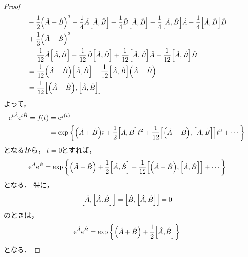 \documentclass{report}
\begin{document}
\begin{proof}
\begin{align}
        &- \frac{1}{2}\qty(\hat{A} + \hat{B})^3 - \frac{1}{4}\hat{A}\qty[\hat{A}, \hat{B}] - \frac{1}{4}\hat{B}\qty[\hat{A}, \hat{B}] - \frac{1}{4}\qty[\hat{A}, \hat{B}]\hat{A} - \frac{1}{4}\qty[\hat{A}, \hat{B}]\hat{B} \notag \\ 
        &+ \frac{1}{3}\qty(\hat{A} + \hat{B})^3 \\ 
        &= \frac{1}{12}\hat{A}\qty[\hat{A}, \hat{B}] - \frac{1}{12}\hat{B}\qty[\hat{A}, \hat{B}] + \frac{1}{12}\qty[\hat{A}, \hat{B}]\hat{A} - \frac{1}{12}\qty[\hat{A}, \hat{B}]\hat{B} \\ 
        &= \frac{1}{12}\qty(\hat{A} - \hat{B})\qty[\hat{A}, \hat{B}] - \frac{1}{12}\qty[\hat{A}, \hat{B}]\qty(\hat{A} - \hat{B}) \\ 
        &= \frac{1}{12}\qty[\qty(\hat{A} - \hat{B}), \qty[\hat{A}, \hat{B}]]
      \end{align}
      よって，
      \begin{align}
        \mathrm{e}^{t\hat{A}}\mathrm{e}^{t\hat{B}} = f(t) &= \mathrm{e}^{g(t)} \\ 
        &= \exp\qty{\qty(\hat{A} + \hat{B})t + \frac{1}{2}\qty[\hat{A}, \hat{B}]t^2 + \frac{1}{12}\qty[\qty(\hat{A} - \hat{B}), \qty[\hat{A}, \hat{B}]]t^3 + \cdots} \\ 
      \end{align}
      となるから，
      $t = 0$とすれば，
      \begin{align}
        \mathrm{e}^{\hat{A}}\mathrm{e}^{\hat{B}} = \exp\qty{\qty(\hat{A} + \hat{B}) + \frac{1}{2}\qty[\hat{A}, \hat{B}] + \frac{1}{12}\qty[\qty(\hat{A} - \hat{B}), \qty[\hat{A}, \hat{B}]] + \cdots}
      \end{align}
      となる．
      特に，
      \begin{align}
        \qty[\hat{A}, \qty[\hat{A}, \hat{B}]] = \qty[\hat{B}, \qty[\hat{A}, \hat{B}]] = 0
      \end{align}
      のときは，
      \begin{align}
        \mathrm{e}^{\hat{A}}\mathrm{e}^{\hat{B}} = \exp\qty{\qty(\hat{A} + \hat{B}) + \frac{1}{2}\qty[\hat{A}, \hat{B}]}
      \end{align}
      となる．
    \end{proof}
\end{document}
